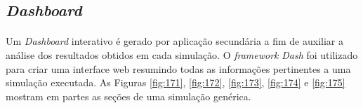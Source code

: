 {\begin{longtable}[m]{| m{11em} | m{21em} |}

\end{longtable}}



\FloatBarrier
\subsection{\textit{Dashboard}}

\paragraph{} Um \textit{Dashboard} interativo é gerado por aplicação secundária a fim de auxiliar a análise dos resultados obtidos em cada simulação. O \textit{framework} \textit{Dash} \cite{dash} foi utilizado para criar uma interface web resumindo todas as informações pertinentes a uma simulação executada. As Figuras \ref{fig:171}, \ref{fig:172}, \ref{fig:173}, \ref{fig:174} e \ref{fig:175} mostram em partes as seções de uma simulação genérica.

